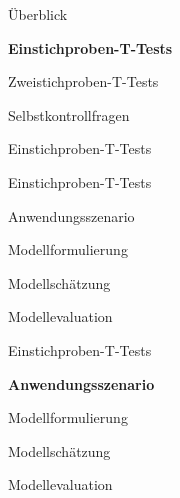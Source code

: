\documentclass[
  8pt,
  ignorenonframetext,
]{beamer}
\begin{document}
\begin{frame}[plain]{}
\protect\hypertarget{section-4}{}
\large
{}
\vfill

Überblick

\textbf{Einstichproben-T-Tests}

Zweistichproben-T-Tests

Selbstkontrollfragen \vfill
\end{frame}

\begin{frame}[plain]{}
\protect\hypertarget{section-5}{}
\center
\huge
\vfill

\noindent Einstichproben-T-Tests \vfill
\end{frame}

\begin{frame}{Einstichproben-T-Tests}
\protect\hypertarget{einstichproben-t-tests}{}
\large
{}
\vfill

Anwendungsszenario

Modellformulierung

Modellschätzung

Modellevaluation \vfill
\end{frame}

\begin{frame}{Einstichproben-T-Tests}
\protect\hypertarget{einstichproben-t-tests-1}{}
\large
{}
\vfill

\textbf{Anwendungsszenario}

Modellformulierung

Modellschätzung

Modellevaluation \vfill
\end{frame}
\end{document}
